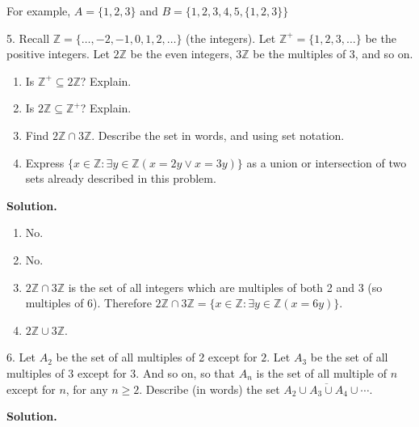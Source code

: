 \documentclass[10pt,]{book}
\theoremstyle{plain}
\theoremstyle{definition}
\theoremstyle{definition}
\theoremstyle{definition}
\numberwithin{equation}{section}
\def\Z{\mathbb Z}
\def\st{:}
\renewcommand{\bar}{\overline}
\begin{document}
\begin{exerciselist}
          For example, \(A = \{1,2,3\}\) and \(B = \{1,2,3,4,5,\{1,2,3\}\}\)
\item[5.]\hypertarget{exercise-15}{}
          Recall \(\Z = \{\ldots,-2,-1,0, 1,2,\ldots\}\) (the integers). Let \(\Z^+ = \{1, 2, 3, \ldots\}\) be the positive integers. Let \(2\Z\) be the even integers, \(3\Z\) be the multiples of 3, and so on.
\leavevmode%
\begin{enumerate}[label=(\alph*)]
\item\hypertarget{li-250}{} Is \(\Z^+ \subseteq 2\Z\)? Explain. %
\item\hypertarget{li-251}{} Is \(2\Z \subseteq \Z^+\)? Explain. %
\item\hypertarget{li-252}{} Find \(2\Z \cap 3\Z\). Describe the set in words, and using set notation. %
\item\hypertarget{li-253}{} Express \(\{x \in \Z \st \exists y\in \Z (x = 2y \vee x = 3y)\}\) as a union or intersection of two sets already described in this problem. %
\end{enumerate}
\par\smallskip
\par\smallskip
\noindent\textbf{Solution.}\hypertarget{solution-27}{}\quad
\leavevmode%
\begin{enumerate}[label=(\alph*)]
\item\hypertarget{li-254}{} No. %
\item\hypertarget{li-255}{} No. %
\item\hypertarget{li-256}{}\(2\Z \cap 3\Z\) is the set of all integers which are multiples of both 2 and 3 (so multiples of 6). Therefore \(2\Z \cap 3\Z = \{x \in \Z \st \exists y\in \Z(x = 6y)\}\).%
\item\hypertarget{li-257}{}\(2\Z \cup 3\Z\).%
\end{enumerate}
\item[6.]\hypertarget{exercise-16}{}
          Let \(A_2\) be the set of all multiples of 2 except for \(2\). Let \(A_3\) be the set of all multiples of 3 except for 3. And so on, so that \(A_n\) is the set of all multiple of \(n\) except for \(n\), for any \(n \ge 2\). Describe (in words) the set \(\bar{A_2 \cup A_3 \cup A_4 \cup \cdots}\).
\par\smallskip
\par\smallskip
\noindent\textbf{Solution.}\hypertarget{solution-28}{}\quad


\end{exerciselist}
\end{document}
